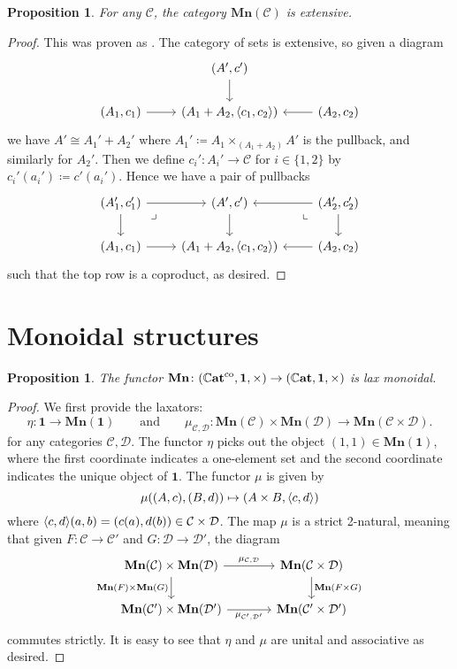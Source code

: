 \documentclass[11pt, one side, article]{memoir}
\theoremstyle{definition}
\theoremstyle{plain}
\newtheorem{proposition}[definitionx]{Proposition}
\DeclarePairedDelimiter{\pair}{\langle}{\rangle}
\newcommand{\cat}[1]{\mathcal{#1}}%
\newcommand{\Cat}[1]{\mathbf{#1}}%
\newcommand{\co}{^\tn{co}}
\newcommand{\tn}[1]{\textnormal{#1}}
\newcommand{\smcat}{\mathbb{C}\Cat{at}}
\newcommand{\0}{\Cat{0}}
\newcommand{\1}{\Cat{1}}
\newcommand{\mn}{\Cat{Mn}}
\newcommand{\qqand}{\qquad\text{and}\qquad}
\begin{document}
\begin{proposition}
For any $\cat{C}$, the category $\mn(\cat{C})$ is extensive.
\end{proposition}
\begin{proof}
This was proven as \cite[Proposition 2.4]{carboni1993introduction}. The category of sets is extensive, so given a diagram
\[
\begin{tikzcd}
	&(A',c')\ar[d]\\
	(A_1,c_1)\ar[r]&(A_1+A_2,\pair{c_1,c_2})&(A_2,c_2)\ar[l]
\end{tikzcd}
\]
we have $A'\cong A_1'+A_2'$ where $A_1'\coloneqq A_1\times_{(A_1+A_2)}A'$ is the pullback, and similarly for $A_2'$. Then we define $c_i'\colon A_i'\to \cat{C}$ for $i\in\{1,2\}$ by $c_i'(a_i')\coloneqq c'(a_i')$.
 Hence we have a pair of pullbacks
\[
\begin{tikzcd}
	(A'_1,c'_1)\ar[r]\ar[d]\ar[dr, phantom, very near start, "\lrcorner"]&
	(A',c')\ar[d]&
	(A'_2,c'_2)\ar[l]\ar[d]\ar[dl, phantom, very near start, "\llcorner"]
	\\
	(A_1,c_1)\ar[r]&(A_1+A_2,\pair{c_1,c_2})&(A_2,c_2)\ar[l]
\end{tikzcd}
\]
such that the top row is a coproduct, as desired.
\end{proof}




\section{Monoidal structures}

\begin{proposition}
The functor $\mn\colon(\smcat\co,\1,\times)\to(\smcat,\1,\times)$ is lax monoidal.
\end{proposition}
\begin{proof}
We first provide the laxators:
\[
  \eta\colon \1\to\mn(\1)
  \qqand
  \mu_{\cat{C},\cat{D}}\colon\mn(\cat{C})\times\mn(\cat{D})\to\mn(\cat{C}\times\cat{D}).
\]
for any categories $\cat{C},\cat{D}$. The functor $\eta$ picks out the object $(1,1)\in\mn(\1)$, where the first coordinate indicates a one-element set and the second coordinate indicates the unique object of $\1$. The functor $\mu$ is given by
\[
\mu((A,c),(B,d))\mapsto(A\times B, \pair{c,d})
\]
where $\pair{c,d}(a,b)=(c(a),d(b))\in\cat{C}\times\cat{D}$. The map $\mu$ is a strict 2-natural, meaning that given $F\colon\cat{C}\to\cat{C}'$ and $G\colon\cat{D}\to\cat{D}'$, the diagram
\[
\begin{tikzcd}[column sep=large]
	\mn(\cat{C})\times\mn(\cat{D})\ar[r, "\mu_{\cat{C},\cat{D}}"]\ar[d, "\mn(F)\times\mn(G)"']&
	\mn(\cat{C}\times\cat{D})\ar[d, "\mn(F\times G)"]\\
	\mn(\cat{C}')\times\mn(\cat{D}')\ar[r, "\mu_{\cat{C'},\cat{D'}}"']&
	\mn(\cat{C}'\times\cat{D}')
\end{tikzcd}
\]
commutes strictly. It is easy to see that $\eta$ and $\mu$ are unital and associative as desired.
\end{proof}
\end{document}

